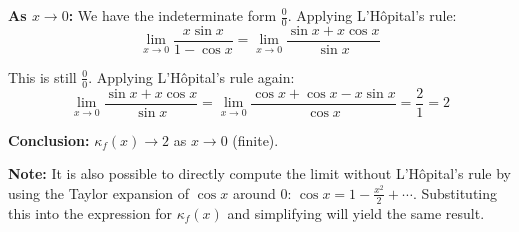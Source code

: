 \documentclass[reqno, answers]{exam}
\begin{document}
\begin{questions}
\begin{solution}
    \textbf{As $x \to 0$:} We have the indeterminate form $\frac{0}{0}$. Applying L'Hôpital's rule:
    $$\lim_{x \to 0} \frac{x \sin x}{1 - \cos x} = \lim_{x \to 0} \frac{\sin x + x \cos x}{\sin x}$$

    This is still $\frac{0}{0}$. Applying L'Hôpital's rule again:
    $$\lim_{x \to 0} \frac{\sin x + x \cos x}{\sin x} = \lim_{x \to 0} \frac{\cos x + \cos x - x \sin x}{\cos x} = \frac{2}{1} = 2$$

    \textbf{Conclusion:} $\kappa_f(x) \to 2$ as $x \to 0$ (finite).
    
    \textbf{Note:} It is also possible to directly compute the limit without L'Hôpital's rule by using the Taylor expansion of $\cos x$ around $0$: $\cos x = 1 - \frac{x^2}{2} + \cdots$. Substituting this into the expression for $\kappa_f(x)$ and simplifying will yield the same result.
  \end{solution}

\end{questions}
\end{document}
